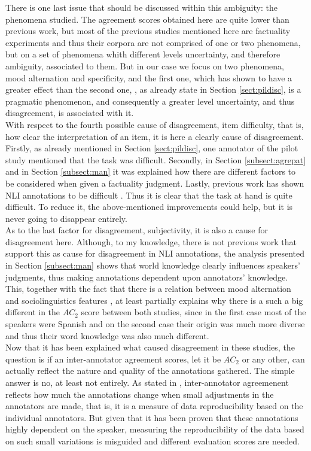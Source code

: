 There is one last issue that should be discussed within this ambiguity: the phenomena studied. The agreement scores obtained here are quite lower than previous work, but most of the previous studies mentioned here are factuality experiments and thus their corpora are not comprised of one or two phenomena, but on a set of phenomena whith different levels uncertainty, and therefore ambiguity, associated to them. But in our case we focus on two phenomena, mood alternation and specificity, and the first one, which has shown to have a greater effect than the second one, , as already state in Section \ref{sect:pildisc}, is a pragmatic phenomenon, and consequently a greater level uncertainty, and thus disagreement, is associated with it.\\

With respect to the fourth possible cause of disagreement, item difficulty, that is, how clear the interpretation of an item, it is here a clearly cause of disagreement. Firstly, as already mentioned in Section \ref{sect:pildisc}, one annotator of the pilot study mentioned that the task was difficult. Secondly, in Section \ref{subsect:agrepat} and in Section \ref{subsect:man} it was explained how there are different factors to be considered when given a factuality judgment. Lastly, previous work has shown NLI annotations to be difficult \citep{pavlick2019inherent,uma2021learning}. Thus it is clear that the task at hand is quite difficult. To reduce it, the above-mentioned improvements could help, but it is never going to disappear entirely.\\

As to the last factor for disagreement, subjectivity, it is also a cause for disagreement here. Although, to my knowledge, there is not previous work that support this as cause for disagreement in NLI annotations, the analysis presented in Section \ref{subsect:man} shows that world knowledge clearly influences speakers' judgments, thus making annotations dependent upon annotators' knowledge. This, together with the fact that there is a relation between mood alternation and sociolinguistics features \citep{waltermire2017mood}, at least partially explains why there is a such a big different in the $AC_2$ score between both studies, since in the first case most of the speakers were Spanish and on the second case their origin was much more diverse and thus their word knowledge was also much different.\\

Now that it has been explained what caused disagreement in these studies, the question is if an inter-annotator agreement scores, let it be $AC_2$ or any other, can actually reflect the nature and quality of the annotations gathered. The simple answer is no, at least not entirely. As stated in \citet{gwet2014handbook}, inter-annotator agreemenent reflects how much the annotations change when small adjustments in the annotators are made, that is, it is a measure of data reproducibility based on the individual annotators. But given that it has been proven that these annotations highly dependent on the speaker, measuring the reproducibility of the data based on such small variations is misguided and different evaluation scores are needed.\\

